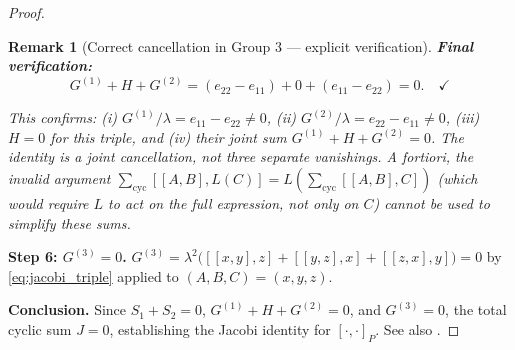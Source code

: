 \documentclass[10pt]{amsart}
\numberwithin{equation}{section}
\newtheorem{remark}[theorem]{Remark}
\begin{document}
\begin{proof}
\begin{remark}[Correct cancellation in Group 3 --- explicit verification]
\medskip
\noindent\textbf{Final verification:}
\[
G^{(1)}+H+G^{(2)} = (e_{22}-e_{11}) + 0 + (e_{11}-e_{22}) = 0. \quad\checkmark
\]

This confirms: (i) $G^{(1)}/\lambda = e_{11}-e_{22} \neq 0$,
(ii) $G^{(2)}/\lambda = e_{22}-e_{11} \neq 0$,
(iii) $H = 0$ for this triple, and (iv) their joint sum $G^{(1)}+H+G^{(2)}=0$.
The identity is a \emph{joint} cancellation, not three separate vanishings.
A fortiori, the invalid argument
$\sum_{\mathrm{cyc}}[[A,B],L(C)] = L(\sum_{\mathrm{cyc}}[[A,B],C])$ (which would
require $L$ to act on the full expression, not only on $C$) cannot be used to simplify
these sums.
\end{remark}

\textbf{Step 6: $G^{(3)}=0$.}
$G^{(3)} = \lambda^2\bigl([[x,y],z]+[[y,z],x]+[[z,x],y]\bigr) = 0$
by \eqref{eq:jacobi_triple} applied to $(A,B,C)=(x,y,z)$.

\medskip
\textbf{Conclusion.} Since $S_1+S_2=0$, $G^{(1)}+H+G^{(2)}=0$, and $G^{(3)}=0$,
the total cyclic sum $J=0$, establishing the Jacobi identity for $[\cdot,\cdot]_P$.
See also \cite[Theorem~3.3]{BaiGuoNi2011}.
\end{proof}
\end{document}
